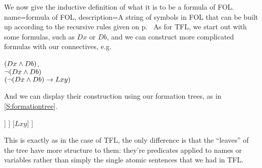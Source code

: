 We now give the inductive definition of what it is to be a formula of FOL.
	{
	name=formula of FOL,
	description={A string of symbols in FOL that can be built up according to the recursive rules given on p.~\pageref{FOLformula}}
	}
	As for TFL, we start out with some formulas, such as $Dx$ or $Db$, and we can construct more complicated formulas with our connectives, e.g. \begin{center}
	$(Dx\eand Db)$, \\
	$\enot (Dx\eand Db)$\\
	$(\enot(Dx\eand Db)\eif Lxy)$
	\end{center}And we can display their construction using our formation trees, as in 	\ref{S:formationtree}.
		\begin{center}
		\begin{forest}
			[$(\enot(Dx\eand Db)\eif Lxy)$
				[$\enot (Dx\eand Db)$
					[$(Dx\eand Db)$
						[$Dx$]
						[$Db$]
					]
				]
				[$Lxy$]
			]
		\end{forest}
		\end{center}This is exactly as in the case of TFL, the only difference is that the ``leaves'' of the tree have more structure to them: they're predicates applied to names or variables rather than simply the single atomic sentences that we had in TFL.

